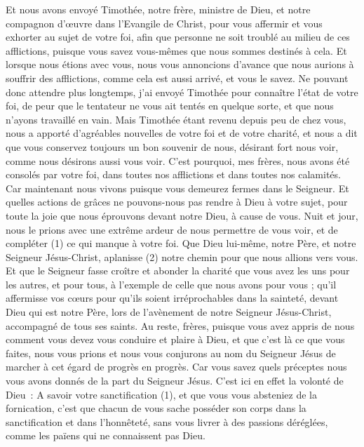 \begin{multicols}{2}
Et nous avons envoyé Timothée, notre frère, ministre de Dieu, et notre compagnon d’œuvre dans l'Evangile de Christ, pour vous affermir et vous exhorter au sujet de votre foi,
afin que personne ne soit troublé au milieu de ces afflictions, puisque vous savez vous-mêmes que nous sommes destinés à cela.
Et lorsque nous étions avec vous, nous vous annoncions d’avance que nous aurions à souffrir des afflictions, comme cela est aussi arrivé, et vous le savez.
Ne pouvant donc attendre plus longtemps, j'ai envoyé Timothée pour connaître l'état de votre foi, de peur que le tentateur ne vous ait tentés en quelque sorte, et que nous n’ayons travaillé en vain.
Mais Timothée étant revenu depuis peu de chez vous, nous a apporté d'agréables nouvelles de votre foi et de votre charité, et nous a dit que vous conservez toujours un bon souvenir de nous, désirant fort nous voir, comme nous désirons aussi vous voir.
C'est pourquoi, mes frères, nous avons été consolés par votre foi, dans toutes nos afflictions et dans toutes nos calamités.
Car maintenant nous vivons puisque vous demeurez fermes dans le Seigneur.
Et quelles actions de grâces ne pouvons-nous pas rendre à Dieu à votre sujet, pour toute la joie que nous éprouvons devant notre Dieu, à cause de vous.
Nuit et jour, nous le prions avec une extrême ardeur de nous permettre de vous voir, et de compléter (1) ce qui manque à votre foi.
Que Dieu lui-même, notre Père, et notre Seigneur Jésus-Christ, aplanisse (2) notre chemin pour que nous allions vers vous.
Et que le Seigneur fasse croître et abonder la charité que vous avez les uns pour les autres, et pour tous, à l’exemple de celle que nous avons pour vous ;
qu’il affermisse vos cœurs pour qu’ils soient irréprochables dans la sainteté, devant Dieu qui est notre Père, lors de l’avènement de notre Seigneur Jésus-Christ, accompagné de tous ses saints.
\VerseOne{}Au reste, frères, puisque vous avez appris de nous comment vous devez vous conduire et plaire à Dieu, et que c’est là ce que vous faites, nous vous prions et nous vous conjurons au nom du Seigneur Jésus de marcher à cet égard de progrès en progrès.
Car vous savez quels préceptes nous vous avons donnés de la part du Seigneur Jésus.
C’est ici en effet la volonté de Dieu : A savoir votre sanctification (1), et que vous vous absteniez de la fornication,
c’est que chacun de vous sache posséder son corps dans la sanctification et dans l’honnêteté,
sans vous livrer à des passions déréglées, comme les païens qui ne connaissent pas Dieu.

\end{multicols}
